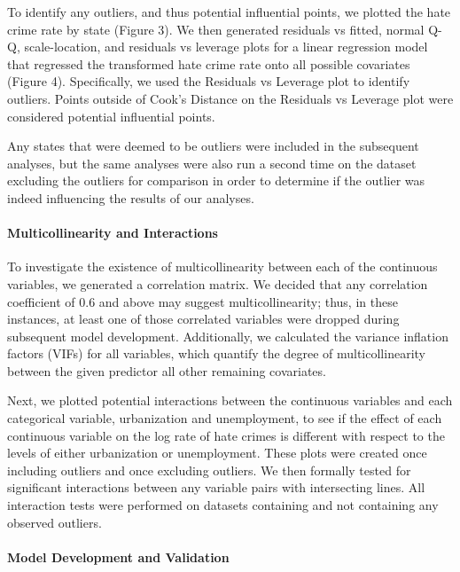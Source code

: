 \documentclass[
]{article}
\begin{document}
To identify any outliers, and thus potential influential points, we
plotted the hate crime rate by state (Figure 3). We then generated
residuals vs fitted, normal Q-Q, scale-location, and residuals vs
leverage plots for a linear regression model that regressed the
transformed hate crime rate onto all possible covariates (Figure 4).
Specifically, we used the Residuals vs Leverage plot to identify
outliers. Points outside of Cook's Distance on the Residuals vs Leverage
plot were considered potential influential points.

Any states that were deemed to be outliers were included in the
subsequent analyses, but the same analyses were also run a second time
on the dataset excluding the outliers for comparison in order to
determine if the outlier was indeed influencing the results of our
analyses.

\hypertarget{multicollinearity-and-interactions}{%
\paragraph{Multicollinearity and
Interactions}\label{multicollinearity-and-interactions}}

To investigate the existence of multicollinearity between each of the
continuous variables, we generated a correlation matrix. We decided that
any correlation coefficient of 0.6 and above may suggest
multicollinearity; thus, in these instances, at least one of those
correlated variables were dropped during subsequent model development.
Additionally, we calculated the variance inflation factors (VIFs) for
all variables, which quantify the degree of multicollinearity between
the given predictor all other remaining covariates.

Next, we plotted potential interactions between the continuous variables
and each categorical variable, urbanization and unemployment, to see if
the effect of each continuous variable on the log rate of hate crimes is
different with respect to the levels of either urbanization or
unemployment. These plots were created once including outliers and once
excluding outliers. We then formally tested for significant interactions
between any variable pairs with intersecting lines. All interaction
tests were performed on datasets containing and not containing any
observed outliers.

\hypertarget{model-development-and-validation}{%
\paragraph{Model Development and
Validation}\label{model-development-and-validation}}
\end{document}
